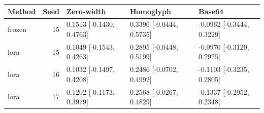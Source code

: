 \begin{tabular}{lrlll}
\toprule
Method & Seed & Zero-width & Homoglyph & Base64\\\midrule
frozen & 15 & 0.1513 [-0.1430, 0.4763] & 0.3396 [-0.0444, 0.5735] & -0.0962 [-0.3444, 0.3229]\\
lora & 15 & 0.1049 [-0.1543, 0.4263] & 0.2895 [-0.0448, 0.5199] & -0.0970 [-0.3129, 0.2925]\\
lora & 16 & 0.1032 [-0.1497, 0.4208] & 0.2486 [-0.0702, 0.4992] & -0.1103 [-0.3235, 0.2805]\\
lora & 17 & 0.1202 [-0.1173, 0.3979] & 0.2568 [-0.0267, 0.4829] & -0.1337 [-0.2952, 0.2348]\\
\bottomrule\end{tabular}
